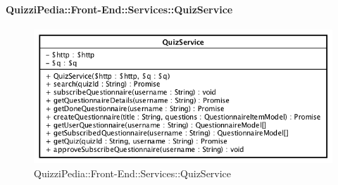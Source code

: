 \paragraph{QuizziPedia::Front-End::Services::QuizService}
\begin{figure}[ht]
	\centering
	\includegraphics[scale=0.80]{UML/Classi/Front-End/QuizziPedia_Front-end_Services_QuizService.png}
	\caption{QuizziPedia::Front-End::Services::QuizService}
\end{figure}\FloatBarrier
